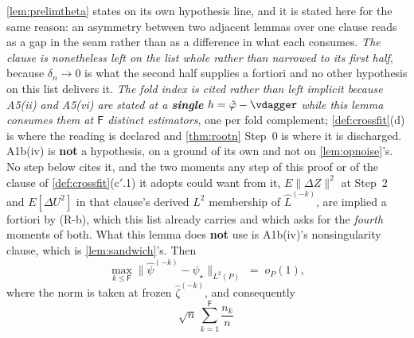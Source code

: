 \begin{lemma}
{\cref{lem:prelimtheta} states on its own hypothesis line}, and it is stated here for the same reason: an
asymmetry between two adjacent lemmas over one clause reads as a gap in the seam rather than as a
difference in what each consumes. \emph{The clause is nonetheless left on the list whole rather than
narrowed to its first half}, because $\delta_n\to0$ is what the second half supplies a fortiori and no
other hypothesis on this list delivers it.
\emph{The fold index is cited rather than left implicit because A5(ii)
and A5(vi) are stated at a \textbf{single} $h=\hat\varphi-\vdagger$ while this lemma consumes them at
$\mathsf F$ distinct estimators}, one per fold complement; \cref{def:crossfit}(d) is where the reading is
declared and \cref{thm:rootn} Step~0 is where it is discharged.
A1b(iv) is \textbf{not} a hypothesis, on a ground of its own and
not on \cref{lem:opnoise}'s. No step below cites it, and the two moments any step of this proof or of the
clause of \cref{def:crossfit}\textup{(c$'$.1)} it adopts could want from it, $E\|\Delta Z\|^{2}$ at
Step~2 and $E[\Delta U^{2}]$ in that clause's derived $L^{2}$ membership of $\hat L^{(-k)}$, are
implied a fortiori by (R-b), which this list already carries and which asks for the \emph{fourth} moments
of both. What this lemma
does \textbf{not} use is A1b(iv)'s nonsingularity clause, which is \cref{lem:sandwich}'s. Then
\begin{equation}\label{eq:psiL2}
\max_{k\le\mathsf F}\big\|\hat\psi^{(-k)}-\psi_\star\big\|_{L^{2}(P)}\;=\;o_P(1),
\end{equation}
where the norm is taken at frozen $\hat\zeta^{(-k)}$, and consequently
\begin{equation}\label{eq:eptermbound}
\sqrt n\,\sum_{k=1}^{\mathsf F}\frac{n_k}{n}\,

\end{equation}
\end{lemma}
